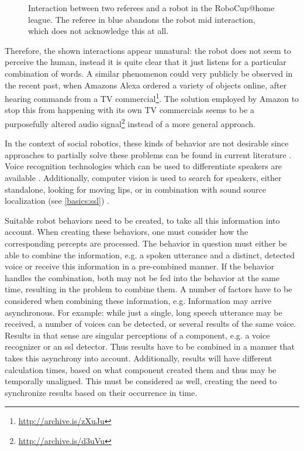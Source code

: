 \begin{figure}[]
	\caption{Interaction between two referees and a robot in the RoboCup@home league.
		The referee in blue abandons the robot mid interaction, which does not acknowledge this at all.}
	\label{pic:moti:imustgonow}
\end{figure}

Therefore, the shown interactions appear unnatural:
the robot does not seem to perceive the human, instead it is quite clear that it just listens for a particular combination of words.
A similar phenomenon could very publicly be observed in the recent past, when Amazons Alexa ordered a variety of objects online, after hearing commands from a  TV commercial\footnote{\url{http://archive.is/zXuJu}}.
The solution employed by Amazon to stop this from happening with its own TV commercials seems to be a purposefully altered audio signal\footnote{\url{http://archive.is/d3uVu}} instead of a more general approach.

In the context of social robotics, these kinds of behavior are not desirable since approaches to partially solve these problems can be found in current literature \cite{opdenAkker:2009:YAR:1708376.1708379}.
Voice recognition technologies which can be used to differentiate speakers are available \cite{DBLP:journals/corr/abs-1003-4083}.
Additionally, computer vision is used to search for speakers, either standalone, looking for moving lips, or in combination with sound source localization (see \ref{basics:ssl}) \cite{1048137,lookwhostalking,840663,whosaidthat}.

Suitable robot behaviors need to be created, to take all this information into account.
When creating these behaviors, one must consider how the corresponding percepts are processed.
The behavior in question must either be able to combine the information, e.g. a spoken utterance and a distinct, detected voice or receive this information in a pre-combined manner.
If the behavior handles the combination, both may not be fed into the behavior at the same time, resulting in the problem to combine them.
A number of factors have to be considered when combining these information, e.g. Information may arrive asynchronous.
For example:
while just a single, long speech utterance may be received, a number of voices can be detected, or several results of the same voice.
Results in that sense are singular perceptions of a component, e.g. a voice recognizer or an \gls{ssl} detector.
Thus results have to be combined in a manner that takes this asynchrony into account.
Additionally, results will have different calculation times, based on what component created them and thus may be temporally unaligned.
This must be considered as well, creating the need to synchronize results based on their occurrence in time.

